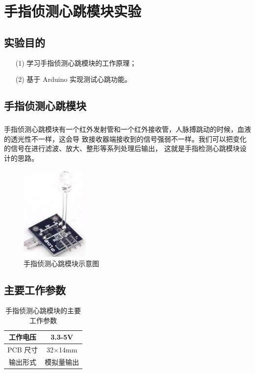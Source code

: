 \documentclass[UTF8, oneside]{ctexbook}
\begin{document}
\chapter{手指侦测心跳模块实验}

\section{实验目的}
\begin{itemize}
    \item[(1)] 学习手指侦测心跳模块的工作原理；
    \item[(2)] 基于 Arduino 实现测试心跳功能。
\end{itemize}

\section{手指侦测心跳模块}
\paragraph{}
手指侦测心跳模块有一个红外发射管和一个红外接收管，人脉搏跳动的时候，血液的透光性不一样，这会导
致接收器端接收到的信号强弱不一样。我们可以把变化的信号在进行滤波、放大、整形等系列处理后输出，
这就是手指检测心跳模块设计的思路。
\begin{figure}[h]
    \centering
    \includegraphics[width=0.3\textwidth]{./result/sensor/22/sensor.png}
    \caption{手指侦测心跳模块示意图}
    \label{22_sensor}
\end{figure}

\section{主要工作参数}
\newpage
\begin{table}[h]
    \centering
    \begin{tabular}{|c|c|}
    \hline
    工作电压   & 3.3-5V         \\ \hline
    PCB 尺寸 & 32$\times$14mm \\ \hline
    输出形式   & 模拟量输出  \\ \hline
    \end{tabular}
    \caption{手指侦测心跳模块的主要工作参数}
\end{table}
\end{document}
